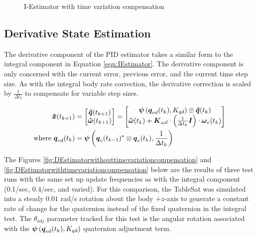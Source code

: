 \begin{figure}[H]
  \centerline{}
  \caption{I-Estimator with time variation compensation}
  \label{fig:IEstimatorwithtimevariationcompensation}
\end{figure}

\subsection{Derivative State Estimation}
\label{subsec:DerivativeEstimator}

The derivative component of the PID estimator takes a similar form to the integral component in Equation \ref{eqn:IEstimator}.  The derivative component is only concerned with the current error, previous error, and the current time step size.  As with the integral body rate correction, the derivative correction is scaled by $\frac{1}{\Delta t_k}$ to compensate for variable step sizes.

\begin{equation}
  \begin{aligned}
    \boldsymbol{\hat{x}}(t_{k+1}) &= \begin{bmatrix} \boldsymbol{\hat{q}}(t_{k+1}) \\ \boldsymbol{\hat{\omega}}(t_{k+1}) \end{bmatrix} =
    \begin{bmatrix} \boldsymbol{\psi}\left(\boldsymbol{q}_{ed}(t_k), K_{qd}\right) \otimes \boldsymbol{\hat{q}}(t_{k}) \\
     \boldsymbol{\hat{\omega}}(t_{k}) + \boldsymbol{K}_{\omega d} \cdot \left(\frac{1}{\Delta t_k} \boldsymbol{I}\right) \cdot \boldsymbol{\omega}_e(t_{k}) \end{bmatrix} \\
    \text{where } \boldsymbol{q}_{ed}(t_k) &= \boldsymbol{\psi}\left(\boldsymbol{q}_e(t_{k-1})^* \otimes \boldsymbol{q}_e(t_{k}), \frac{1}{\Delta t_{k}}\right)
  \end{aligned}
  \label{eqn:DEstimator}
\end{equation}

The Figures \ref{fig:DEstimatorwithouttimevariationcompensation} and \ref{fig:DEstimatorwithtimevariationcompensation} below are the results of three test runs with the same set up update frequencies as with the integral component (0.1/sec, 0.4/sec, and varied).  For this comparison, the TableSat was simulated into a steady $0.01$ rad/s rotation about the body $+z$-axis to generate a constant rate of change for the quaternion instead of the fixed quaternion in the integral test.  The $\theta_{adj}$ parameter tracked for this test is the angular rotation associated with the $\boldsymbol{\psi}\left(\boldsymbol{q}_{ed}(t_k), K_{qd}\right)$ quaternion adjustment term.

